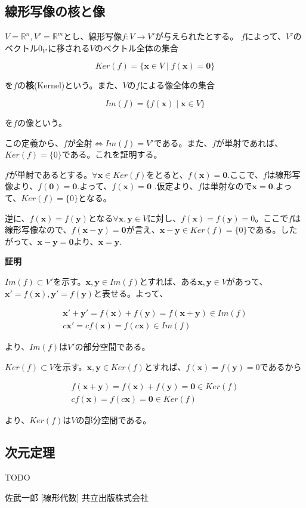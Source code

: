 \documentclass[dvipdfmx,autodetect-engine]{jsarticle}
\newcommand{\vecSet}[1]{\mathbb{R}^{#1}}
\begin{document}
\subsection{線形写像の核と像}

$V = \vecSet{n}, V' = \vecSet{m}$とし、線形写像$f: V \to V'$が与えられたとする。
$f$によって、$V'$のベクトル$0_{V'}$に移される$V$のベクトル全体の集合

$$
Ker(f) = \{\bm{x} \in V \mid f(\bm{x}) = \bm{0}\}
$$

を$f$の{\bf 核}(Kernel)という。また、$V$の$f$による像全体の集合

$$
Im(f) = \{f(\bm{x}) \mid \bm{x} \in V\}
$$

を$f$の像という。

この定義から、$f$が全射$\Longleftrightarrow Im(f) = V'$である。また、$f$が単射であれば、$Ker(f) = \{0\}$である。これを証明する。

$f$が単射であるとする。$\forall \bm{x} \in Ker(f)$をとると、$f(\bm{x}) = \bm{0}$.ここで、$f$は線形写像より、$f(\bm{0}) = \bm{0}$.よって、$f(\bm{x}) = \bm{0}$ .仮定より、$f$は単射なので$\bm{x} = \bm{0}$.よって、$Ker(f) = \{0\}$となる。

逆に、$f(\bm{x}) = f(\bm{y})$となる$\forall \bm{x}, \bm{y} \in V$に対し、$f(\bm{x}) = f(\bm{y}) = 0$。ここで$f$は線形写像なので、$f(\bm{x} - \bm{y}) = \bm{0}$が言え、$\bm{x} - \bm{y} \in Ker(f) = \{0\}$である。したがって、$\bm{x} - \bm{y} = \bm{0}$より、$\bm{x} = \bm{y}$.


{\bf 証明}

$Im(f) \subset V'$を示す。$\bm{x}, \bm{y} \in Im(f)$とすれば、ある$\bm{x}, \bm{y} \in V$があって、$\bm{x}' = f(\bm{x}), \bm{y}' = f(\bm{y})$と表せる。よって、

\begin{eqnarray*}
\bm{x}' + \bm{y}' = f(\bm{x}) + f(\bm{y}) = f(\bm{x} + \bm{y}) \in Im(f) \\
c\bm{x}' = cf(\bm{x}) = f(c\bm{x}) \in Im(f)
\end{eqnarray*}

より、$Im(f)$は$V'$の部分空間である。

$Ker(f) \subset V$を示す。$\bm{x}, \bm{y} \in Ker(f)$とすれば、$f(\bm{x}) = f(\bm{y}) = 0$であるから

\begin{eqnarray*}
f(\bm{x} + \bm{y}) = f(\bm{x}) + f(\bm{y}) = \bm{0} \in Ker(f) \\
cf(\bm{x}) = f(c\bm{x}) = \bm{0} \in Ker(f)
\end{eqnarray*}

より、$Ker(f)$は$V$の部分空間である。

\subsection{次元定理}

TODO

\begin{thebibliography}{n}
 佐武一郎 [線形代数] 共立出版株式会社
\end{thebibliography}
\end{document}
